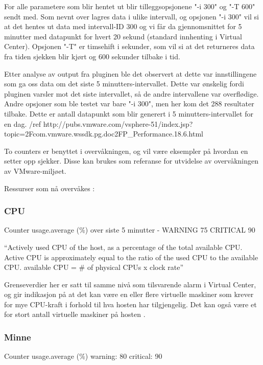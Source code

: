 For alle parametere som blir hentet ut blir tilleggsopsjonene "-i 300" og "-T 600" sendt med. Som nevnt over lagres data i ulike intervall, og opsjonen "-i 300" vil si at det hentes ut data med intervall-ID 300 og vi får da gjennomsnittet for 5 minutter med datapunkt for hvert 20 sekund (standard innhenting i Virtual Center). Opsjonen "-T" er timsehift i sekunder, som vil si at det returneres data fra tiden sjekken blir kjørt og 600 sekunder tilbake i tid. 

Etter analyse av output fra pluginen ble det observert at dette var innstillingene som ga oss data om det siste 5 minutters-intervallet. Dette var ønskelig fordi pluginen varsler mot det siste intervallet, så de andre intervallene var overflødige. Andre opsjoner som ble testet var bare "-i 300", men her kom det 288 resultater tilbake. Dette er antall datapunkt som blir generert i 5 minutters-intervallet for en dag. /ref http://pubs.vmware.com/vsphere-51/index.jsp?topic=2Fcom.vmware.wssdk.pg.doc2FP\_Performance.18.6.html


To counters er benyttet i overvåkningen, og vil være eksempler på hvordan en setter opp sjekker. Disse kan brukes som referanse for utvidelse av overvåkningen av VMware-miljøet. 

Ressurser som nå overvåkes \cite{ciscovirtual} \cite{vmwaremonitoring}:
 
\subsubsection*{CPU}

Counter usage.average (\%) over siste 5 minutter -  WARNING 75 CRITICAL 90 


``Actively used CPU of the host, as a percentage of the total available CPU. Active CPU is approximately equal to the ratio of the used CPU to the available CPU. available CPU = \# of physical CPUs x clock rate''

Grenseverdier her er satt til samme nivå som tilsvarende alarm i Virtual Center, og gir indikasjon på at det kan være en eller flere virtuelle maskiner som krever for mye CPU-kraft i forhold til hva hosten har tilgjengelig. Det kan også være et for stort antall virtuelle maskiner på hosten \cite{vmwarecounters}. 

\subsubsection*{Minne}

Counter usage.average (\%) warning: 80 critical: 90

